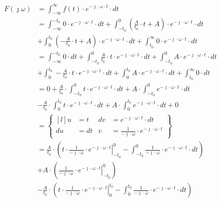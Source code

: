\begin{task}
\begin{align*}
F(\jmath \omega )&=\int_{-\infty }^{\infty}f(t) \cdot e^{-\jmath \cdot \omega \cdot t}\cdot dt\\ %
&=\int_{-\infty}^{-t_{0}} 0 \cdot e^{-\jmath \cdot \omega \cdot t}\cdot dt %
+\int_{-t_{0}}^{0} \left(\frac{A}{t_{0}} \cdot t + A\right) \cdot e^{-\jmath \cdot \omega \cdot t}\cdot dt\\
&+\int_{0}^{t_{0}} \left(-\frac{A}{t_{0}} \cdot t + A\right) \cdot e^{-\jmath \cdot \omega \cdot t}\cdot dt
+\int_{t_{0}}^{\infty} 0 \cdot e^{-\jmath \cdot \omega \cdot t}\cdot dt\\
&=\int_{-\infty}^{-t_{0}} 0 \cdot dt +\int_{-t_{0}}^{0}\frac{A}{t_{0}} \cdot t \cdot e^{-\jmath \cdot \omega \cdot t}\cdot dt %
+\int_{-t_{0}}^{0}A \cdot e^{-\jmath \cdot \omega \cdot t}\cdot dt\\
&+\int_{0}^{t_{0}} -\frac{A}{t_{0}} \cdot t \cdot e^{-\jmath \cdot \omega \cdot t}\cdot dt 
+\int_{0}^{t_{0}} A \cdot e^{-\jmath \cdot \omega \cdot t}\cdot dt + \int_{t_{0}}^{\infty} 0 \cdot dt\\
&= 0  + \frac{A}{t_{0}} \cdot \int_{-t_{0}}^{0} t \cdot e^{-\jmath \cdot \omega \cdot t}\cdot dt %
+A \cdot \int_{-t_{0}}^{0} e^{-\jmath \cdot \omega \cdot t}\cdot dt\\
&-\frac{A}{t_{0}} \cdot \int_{0}^{t_{0}} t \cdot e^{-\jmath \cdot \omega \cdot t}\cdot dt 
+A \cdot \int_{0}^{t_{0}} e^{-\jmath \cdot \omega \cdot t}\cdot dt + 0\\
&=\begin{Bmatrix*}[l] %
u&=t & dv&=e^{ -\jmath \cdot \omega \cdot t} \cdot dt \\
du&=dt & v&=\frac{1}{-\jmath \cdot \omega}\cdot e^{ -\jmath \cdot \omega \cdot t}
\end{Bmatrix*}\\
&=\frac{A}{t_{0}}\cdot \left( \left. t \cdot \frac{1}{-\jmath \cdot \omega}\cdot e^{ -\jmath \cdot \omega \cdot t} \right|_{-t_{0}}^{0} %
- \int_{-t_{0}}^{0} \frac{1}{-\jmath \cdot \omega}\cdot e^{ -\jmath \cdot \omega \cdot t} \cdot dt \right)\\
&+ A\cdot \left( \left. \frac{1}{-\jmath \cdot \omega}\cdot e^{ -\jmath \cdot \omega \cdot t} \right|_{-t_{0}}^{0}\right)\\
&-\frac{A}{t_{0}}\cdot \left( \left. t \cdot \frac{1}{-\jmath \cdot \omega}\cdot e^{ -\jmath \cdot \omega \cdot t} \right|_{0}^{t_{0}}
- \int_{0}^{t_{0}} \frac{1}{-\jmath \cdot \omega}\cdot e^{ -\jmath \cdot \omega \cdot t} \cdot dt \right)\\

\end{align*}
\end{task}
